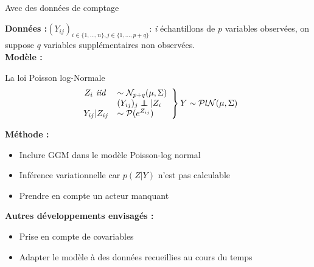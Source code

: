 \documentclass{bredelebeamer}
\newcommand\independent{\protect\mathpalette{\protect\independenT}{\perp}}
\def\independenT#1#2{\mathrel{\rlap{$#1#2$}\mkern2mu{#1#2}}}
\begin{document}
\begin{frame}{Avec des données de comptage}



\textbf{Données :}$(Y_{ij})_{i \in \{1,...,n\}, j \in \{1,...,p+q\}}$: \textit{i} échantillons de $p$ variables observées, on suppose $q$ variables supplémentaires non observées.\\
\vspace{0.3cm}
\textbf{Modèle :}

\begin{exampleblock}{La loi Poisson log-Normale}
\[
            \left.
                \begin{array}{rl}
                Z_i \textit{ iid } &\sim \mathcal{N}_{p+q}(\mu,\Sigma)\\
                    &(Y_{ij})_j \independent |Z_i\\
                    Y_{ij}|Z_{ij} &\sim \mathcal{P}(e^{Z_{ij}}) 
                   
                \end{array}
            \right \} Y \sim \mathcal{P}l\mathcal{N}(\mu, \Sigma)  
            \]
            
       
\end{exampleblock}
\textbf{Méthode :}        

\begin{itemize}
\item Inclure GGM dans le modèle Poisson-log normal
\item Inférence variationnelle car $p(Z|Y)$ n'est pas calculable
\item Prendre en compte un acteur manquant
\end{itemize}
\vspace{0.3cm}
\textbf{Autres développements envisagés :}
\begin{itemize}
    
\item Prise en compte de covariables
\item Adapter le modèle à des données recueillies au cours du temps

\end{itemize}
\end{frame}
\end{document}
